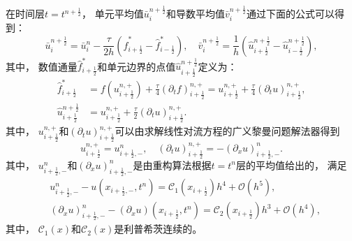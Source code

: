 \vspace{0.3\baselineskip} %
在时间层$t=t^{n+\frac{1}{2}}$，
单元平均值$\bar{u}_{i}^{n+\frac{1}{2}}$和导数平均值$\bar{v}_{i}^{n+\frac{1}{2}}$通过下面的公式可以得到：
\begin{equation}
  \bar{u}_{i}^{n+\frac 12}=\bar{u}_{i}^{n}-\frac{\tau}{2 h} \left(\hat{f}_{i+\frac 12}^*-\hat{f}_{i-\frac 12}^*\right), \quad
  \bar{v}_{i}^{n+\frac 12}=\frac{1}{h} \left(\hat u_{i+\frac 12}^{n+\frac 12}-\hat u_{i-\frac 12}^{n+\frac 12}\right),
\end{equation}
其中，
数值通量$\hat{f}_{i+\frac 12}^*$和单元边界的点值$\hat u_{i+\frac 12}^{n+\frac 12}$定义为：
\begin{align}
  \label{eq:1D-s2-uhat}
  \hat{f}^*_{i+\frac{1}{2}}
   & ={f} \left(u_{i+\frac{1}{2}}^{n, +}\right) +\frac{\tau}{4} \left({\partial_{t}}{f}\right)_{i+\frac{1}{2}}^{n, +}=u_{i+\frac{1}{2}}^{n, +} +\frac{\tau}{4} \left({\partial_{t}}{u}\right)_{i+\frac{1}{2}}^{n, +}, \\
  \hat u_{i+\frac{1}{2}}^{n+\frac 12}
   & =u_{i+\frac{1}{2}}^{n, +}+\frac{\tau}{2} \left({\partial_{t}}u\right)_{i+\frac{1}{2}}^{n, +}.
\end{align}
其中，
$u_{i+\frac{1}{2}}^{n, +}$和$\left({\partial_{t}}u\right)_{i+\frac{1}{2}}^{n, +}$可以由求解线性对流方程的广义黎曼问题解法器得到
\begin{equation}
  u_{i+\frac{1}{2}}^{n, +} = u_{i+\frac{1}{2},-}^{n},\quad
  \left({\partial_{t}}u\right)_{i+\frac{1}{2}}^{n, +} =
  -\left({\partial_{x}}u\right)_{i+\frac{1}{2},-}^{n}.
\end{equation}
其中，
$u_{i+\frac{1}{2},-}^{n}$和$\left({\partial_{x}}u\right)_{i+\frac{1}{2},-}^{n}$是由重构算法根据$t=t^{n}$层的平均值给出的，
满足
\begin{align}
  \label{eq:1D-linear-rec-1}
   & {u}_{i+\frac12,-}^n - {u}(x_{i+\frac12,-},t^n) = \mathcal{C}_1(x_{i+\frac{1}{2}})h^4+{\mathcal{O}}(h^{5}),                                                  \\
  \label{eq:1D-linear-rec-2}
   & \left({\partial_x}{u}\right)_{i+\frac12,-}^n - \left({\partial_x}{u}\right)(x_{i+\frac12},t^n) = \mathcal{C}_2(x_{i+\frac{1}{2}})h^3+{\mathcal{O}}(h^{4}),
\end{align}
其中，
$\mathcal{C}_1(x)$和$\mathcal{C}_2(x)$是利普希茨连续的。

